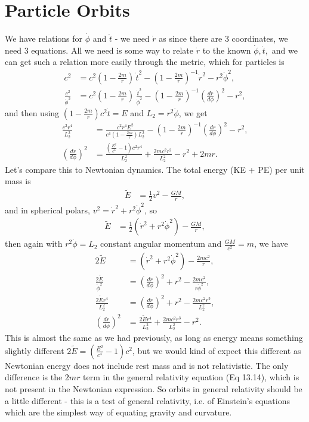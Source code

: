 \documentclass[a4paper, 11pt, normalem]{report}
\begin{document}
\section{Particle Orbits}
We have relations for $\dot{\phi}$ and $\dot{t}$ - we need $\dot{r}$ as since there are 3 coordinates, we need 3 equations.
All we need is some way to relate $\dot{r}$ to the known $\dot{\phi},\dot{t},$ and we can get such a relation more easily through the metric, which for particles is
\begin{align}
    c^2 &= c^2\left(1-\frac{2m}{r}\right)\,\dot{t}^2 - \left(1-\frac{2m}{r}\right)^{-1}\dot{r}^2 - r^2\dot{\phi}^2, \\
    \frac{c^2}{\dot{\phi}^2} &= c^2\left(1-\frac{2m}{r}\right)\,\frac{\dot{t}^2}{\dot{\phi}^2} - \left(1-\frac{2m}{r}\right)^{-1}\left(\frac{dr}{d\phi}\right)^2 - r^2,
\end{align}
and then using $\left(1-\frac{2m}{r}\right)c^2\dot{t}=E$ and $L_2=r^2\dot{\phi}$, we get
\begin{align}
    \frac{c^2r^4}{L_2^2} &= \frac{c^2r^4E^2}{c^4\left(1-\frac{2m}{r}\right)L_2^2} - \left(1-\frac{2m}{r}\right)^{-1}\left(\frac{dr}{d\phi}\right)^2 - r^2, \\
    \left(\frac{dr}{d\phi}\right)^2 &= \frac{\left(\frac{E^2}{c^4}-1\right)c^2r^4}{L_2^2} + \frac{2mc^2r^2}{L_2^2} - r^2 + 2mr.
\end{align}
Let's compare this to Newtonian dynamics.
The total energy (KE + PE) per unit mass is 
\begin{align}
    \tilde{E} &= \frac12v^2-\frac{GM}{r},
\end{align}
and in spherical polars, $v^2=\dot{r}^2+r^2\dot{\phi}^2$, so 
\begin{align}
    \tilde{E} &= \frac12\left(\dot{r}^2+r^2\dot{\phi}^2\right)-\frac{GM}{r},
\end{align}
then again with $r^2\dot{\phi} = L_2$ constant angular momentum and $\frac{GM}{c^2} = m$, we have
\begin{align}
    2\tilde{E} &= \left(\dot{r}^2+r^2\dot{\phi}^2\right) - \frac{2mc^2}{r},\\
    \frac{2\tilde{E}}{\dot{\phi}^2} &= \left(\frac{dr}{d\phi}\right)^2 + r^2 - \frac{2mc^2}{r\dot{\phi}^2},\\
    \frac{2\tilde{E}r^4}{L_2^2} &= \left(\frac{dr}{d\phi}\right)^2 + r^2 - \frac{2mc^2r^3}{L_2^2},\\
    \left(\frac{dr}{d\phi}\right)^2 &= \frac{2\tilde{E}r^4}{L_2^2} + \frac{2mc^2r^3}{L_2^2} - r^2.
\end{align}
This is almost the same as we had previously, as long as energy means something slightly different $2\tilde{E} = \left(\frac{E^2}{c^4}-1\right)c^2$, but we would kind of expect this different as Newtonian energy does not include rest mass and is not relativistic.
The only difference is the $2mr$ term in the general relativity equation (Eq 13.14), which is not present in the Newtonian expression. 
So orbits in general relativity should be a little different - this is a test of general relativity, i.e. of Einstein's equations which are the simplest way of equating gravity and curvature. 
\end{document}
